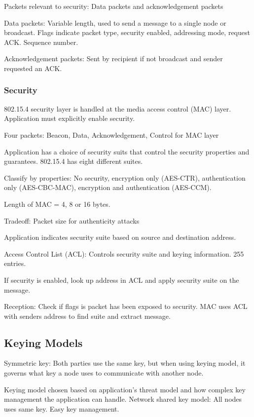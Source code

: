 \documentclass[10pt]{article}
\begin{document}
Packets relevant to security: Data packets and acknowledgement packets

Data packets: Variable length, used to send a message to a single node or broadcast. Flags indicate packet type, security enabled, addressing mode, request ACK. Sequence number.


Acknowledgement packets: Sent by recipient if not broadcast and sender requested an ACK.



\subsubsection{Security}

802.15.4 security layer is handled at the media access control (MAC) layer. Application must explicitly enable security.

Four packets: Beacon, Data, Acknowledgement, Control for MAC layer

Application has a choice of security suits that control the security properties and guarantees. 802.15.4 has eight different suites.

Classify by properties: No security, encryption only (AES-CTR), authentication only (AES-CBC-MAC), encryption and authentication (AES-CCM).

Length of MAC = 4, 8 or 16 bytes.

Tradeoff: Packet size for authenticity attacks


Application indicates security suite based on source and destination address.

Access Control List (ACL): Controls security suite and keying information. 255 entries.

If security is enabled, look up address in ACL and apply security suite on the message.

Reception: Check if flags is packet has been exposed to security. MAC uses ACL with senders address to find suite and extract message.




\subsection{Keying Models}

Symmetric key: Both parties use the same key, but when using keying model, it governs what key a node uses to communicate with another node.

Keying model chosen based on application's threat model and how complex key management the application can handle. Network shared key model: All nodes uses same key. Easy key management.
\end{document}

